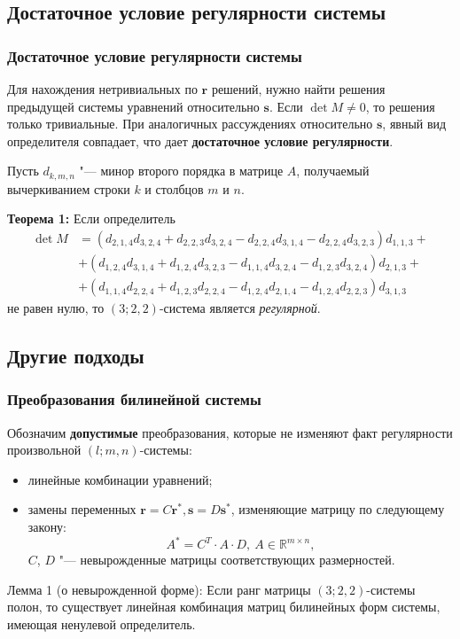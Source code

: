\documentclass[russian,hyperref={unicode}]{beamer}
\begin{document}
\subsection{Достаточное условие регулярности системы}
\frame
{
	\frametitle{Достаточное условие регулярности системы}
	Для нахождения нетривиальных по $\mathbf{r}$ решений, нужно найти решения предыдущей 
	системы уравнений относительно $\mathbf{s}$. Если $\det M \ne 0$, то решения только 
	тривиальные. При аналогичных рассуждениях относительно $\mathbf{s}$, явный вид 
	определителя совпадает, что дает \textbf{достаточное условие регулярности}.  
		
	Пусть $d_{k, m, n}$ "--- минор второго порядка в матрице $A$, получаемый 
	вычеркиванием строки $k$ и столбцов $m$ и $n$.
	
	\textbf{Теорема 1:}
	Если определитель 
	\begin{align*}
	 	\det M & = (d_{2,1,4} d_{3,2,4} + d_{2,2,3} d_{3,2,4} - d_{2,2,4} d_{3,1,4} - 
	 	d_{2,2,4} d_{3,2,3}) d_{1,1,3} + \\
	 	& + (d_{1,2,4} d_{3,1,4} + d_{1,2,4} d_{3,2,3} - d_{1,1,4} d_{3,2,4} -	
		d_{1,2,3} d_{3,2,4}) d_{2,1,3} + \\		 
	 	& + (d_{1,1,4} d_{2,2,4} + d_{1,2,3}d_{2,2,4} - d_{1,2,4}d_{2,1,4} - 
		d_{1,2,4} d_{2,2,3}) d_{3,1,3}
	\end{align*} 
	не равен нулю, то $(3; 2, 2)$-система является \textit{регулярной}.
}
\subsection{Другие подходы}
\frame
{
	\frametitle{Преобразования билинейной системы}
	Обозначим \textbf{допустимые} преобразования, которые не изменяют факт регулярности 
	произвольной $(l; m, n)$-системы: 
	\begin{itemize}
		\item линейные комбинации уравнений;
		\item замены переменных $
			\mathbf{r} = C \mathbf{r}^*, \mathbf{s} = D \mathbf{s}^* 
		$, изменяющие матрицу по следующему закону: 
		$$
			A^* = C^T \cdot A \cdot D,~A \in \mathbb{R}^{m \times n},
		$$
		$C$, $D$ "--- невырожденные матрицы соответствующих размерностей. 
	\end{itemize}
	\begin{block}{Лемма 1 (о невырожденной форме):}
		Если ранг матрицы $(3; 2,2)$-системы полон, то существует линейная комбинация 
		матриц билинейных форм системы, имеющая ненулевой определитель.
	\end{block}
}
\end{document}

